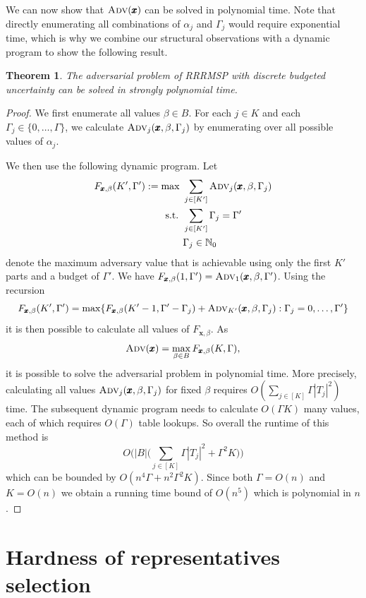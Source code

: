 \documentclass[a4paper,11pt,abstracton]{scrartcl}
\newtheorem{theorem}{Theorem}%
\theoremstyle{definition}
\theoremstyle{remark}
\begin{document}
We can now show that $\textsc{Adv}(\pmb{x})$ can be solved in polynomial time. Note that directly enumerating all combinations of $\alpha_j$ and $\Gamma_j$ would require exponential time, which is why we combine our structural observations with a dynamic program to show the following result.

\begin{theorem}\label{th:adv}
The adversarial problem of RRRMSP with discrete budgeted uncertainty can be solved in strongly polynomial time.
\end{theorem}
\begin{proof}
We first enumerate all values $\beta\in B$. For each $j\in K$ and each $\Gamma_j\in\{0,\ldots,\Gamma\}$,  we calculate $\textsc{Adv}_j(\pmb{x},\beta,\Gamma_j)$ by enumerating over all possible values of $\alpha_j$. 

We then use the following dynamic program. Let 
\begin{align*}
F_{\pmb{x},\beta}(K',\Gamma') := \max \ & \sum_{j\in[K']} \textsc{Adv}_j(\pmb{x},\beta,\Gamma_j) \\
\text{s.t. } & \sum_{j\in[K']} \Gamma_j = \Gamma' \\
& \Gamma_j \in \mathbb{N}_0
\end{align*}
denote the maximum adversary value that is achievable using only the first $K'$ parts and a budget of $\Gamma'$. We have $F_{\pmb{x},\beta}(1,\Gamma') = \textsc{Adv}_1(\pmb{x},\beta,\Gamma')$. Using the recursion
\[ F_{\pmb{x},\beta}(K',\Gamma') = \max\{ F_{\pmb{x},\beta}(K'-1,\Gamma'-\Gamma_j) + \textsc{Adv}_{K'}(\pmb{x},\beta,\Gamma_j) : \Gamma_j=0,\ldots,\Gamma'\} \]
it is then possible to calculate all values of $F_{\pmb{x},\beta}$. As
\[ \textsc{Adv}(\pmb{x}) = \max_{\beta\in B} F_{\pmb{x},\beta}(K,\Gamma), \]
it is possible to solve the adversarial problem in polynomial time. More precisely, calculating all values $\textsc{Adv}_j(\pmb{x},\beta,\Gamma_j)$ for fixed $\beta$ requires $O( \sum_{j\in[K]} \Gamma|T_j|^2)$ time. The subsequent dynamic program needs to calculate $O(\Gamma K)$ many values, each of which requires $O(\Gamma)$ table lookups. So overall the runtime of this method is
\[ O\Bigg(|B|\Big(\sum_{j\in[K]} \Gamma|T_j|^2 + \Gamma^2 K\Big) \Bigg) \]
which can be bounded by $O(n^4\Gamma + n^2 \Gamma^2 K )$. Since both $\Gamma = O(n)$ and $K = O(n)$
we obtain a running time bound of $O(n^5)$ which is polynomial in $n$.
\end{proof}




\section{Hardness of representatives selection}
\label{sec:hardness}
\end{document}
